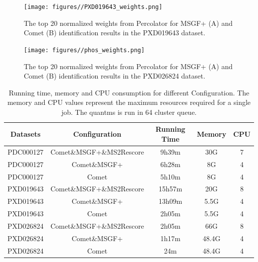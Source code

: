 \documentclass[12pt]{article}
\begin{document}
\begin{figure}[ht!]
	\centering
	\texttt{[image: figures//PXD019643\_weights.png]}
	\caption{The top 20 normalized weights from Percolator for MSGF+ (A) and Comet (B) identification results in the PXD019643 dataset.}
	\label{fig:PXD019643_features}
\end{figure}

\begin{figure}[ht!]
	\centering
	\texttt{[image: figures//phos\_weights.png]}
	\caption{The top 20 normalized weights from Percolator for MSGF+ (A) and Comet (B) identification results in the PXD026824 dataset.}
	\label{fig:phospho_features}
\end{figure}


\renewcommand\thetable{S\arabic{table}}
\setcounter{table}{0}


\begin{table}[h!]
	\centering
	\caption{Running time, memory and CPU consumption for different Configuration. The memory and CPU values represent the maximum resources required for a single job. The quantms is run in 64 cluster queue.}
	\begin{tabular}{|c|c|c|c|c|}
		\hline
		Datasets & Configuration & Running Time & Memory & CPU \\
		\hline
		PDC000127 & Comet\&MSGF+\&MS2Rescore & 9h39m & 30G & 7 \\
		PDC000127 & Comet\&MSGF+ & 6h28m & 8G & 4 \\
		PDC000127 & Comet & 5h10m & 8G & 4 \\
		PXD019643 & Comet\&MSGF+\&MS2Rescore & 15h57m & 20G & 8 \\
		PXD019643 & Comet\&MSGF+ & 13h09m & 5.5G & 4 \\
		PXD019643 & Comet & 2h05m & 5.5G & 4 \\
		PXD026824 & Comet\&MSGF+\&MS2Rescore & 2h05m & 66G & 8 \\
		PXD026824 & Comet\&MSGF+ & 1h17m & 48.4G & 4 \\
		PXD026824 & Comet & 24m & 48.4G & 4 \\
		\hline
	\end{tabular}
	\label{tab:resources_stats}
\end{table}
\end{document}
